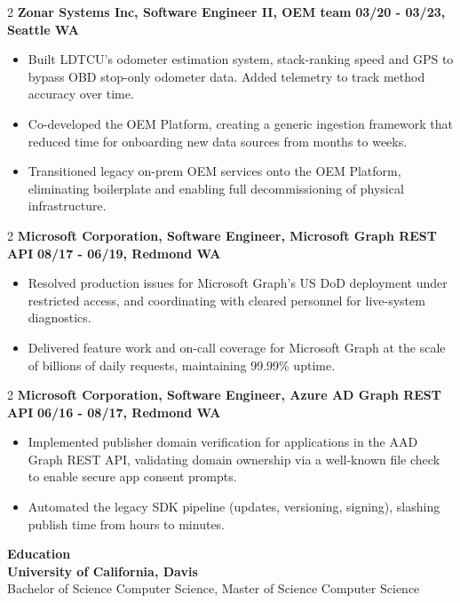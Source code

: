 \documentclass[]{article}
\begin{document}
    \begin{paracol}{2}
    \textbf{Zonar Systems Inc, Software Engineer II, OEM team}
    \switchcolumn
    \textbf{03/20 - 03/23, Seattle WA}
    \end{paracol}
    \begin{itemize}
        \item Built LDTCU's odometer estimation system, stack-ranking speed and GPS to bypass OBD stop-only odometer data. Added telemetry to track method accuracy over time.
        \item Co-developed the OEM Platform, creating a generic ingestion framework that reduced time for onboarding new data sources from months to weeks.
        \item Transitioned legacy on-prem OEM services onto the OEM Platform, eliminating boilerplate and enabling full decommissioning of physical infrastructure.
    \end{itemize}
    \smallskip

    \begin{paracol}{2}
    \textbf{Microsoft Corporation, Software Engineer, Microsoft Graph REST API}
    \switchcolumn
    \textbf{08/17 - 06/19, Redmond WA}
    \end{paracol}
    \begin{itemize}
        \item Resolved production issues for Microsoft Graph's US DoD deployment under restricted access, and coordinating with cleared personnel for live-system diagnostics.
        \item Delivered feature work and on-call coverage for Microsoft Graph at the scale of billions of daily requests, maintaining 99.99\% uptime.
    \end{itemize}
    \smallskip

    \begin{paracol}{2}
    \textbf{Microsoft Corporation, Software Engineer, Azure AD Graph REST API}
    \switchcolumn
    \textbf{06/16 - 08/17, Redmond WA}
    \end{paracol}
    \begin{itemize}
        \item Implemented publisher domain verification for applications in the AAD Graph REST API, validating domain ownership via a well-known file check to enable secure app consent prompts.
        \item Automated the legacy SDK pipeline (updates, versioning, signing), slashing publish time from hours to minutes.
    \end{itemize}

    \bigskip
    {\large \textbf{Education}}\\
    \smallskip
    \textbf{University of California, Davis}
    \\ Bachelor of Science Computer Science, Master of Science Computer Science
\end{document}
